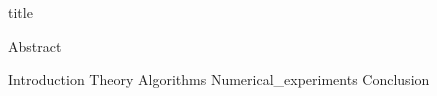 \documentclass{article}
\begin{document}


{title}

\frontmatter

{Abstract}
\newpage

\tableofcontents

\listoffigures
\listoftables

\mainmatter


{Introduction}
{Theory}
{Algorithms}
{Numerical_experiments}
{Conclusion}



\newpage
\printbibliography[heading = bibintoc, title = Bibliography]    %


\end{document}
